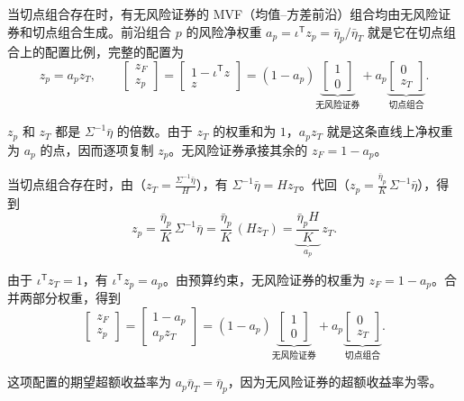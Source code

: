 \begin{tcolorbox}
 当切点组合存在时，有无风险证券的 MVF（均值--方差前沿）组合均由无风险证券和切点组合生成。前沿组合 $p$ 的风险净权重 $a_p=\iota^{\mathsf T}z_p=\bar\eta_p/\bar\eta_T$ 就是它在切点组合上的配置比例，完整的配置为
\begin{equation}
 z_p=a_pz_T,\qquad
 \begin{bmatrix}z_F\\z_p\end{bmatrix}
 =\begin{bmatrix}1-\iota^{\mathsf T}z\\z\end{bmatrix}=(1-a_p)\underbrace{\begin{bmatrix}1\\0\end{bmatrix}}_{\text{无风险证券}}
 +a_p\underbrace{\begin{bmatrix}0\\z_T\end{bmatrix}}_{\text{切点组合}}.
 \label{eq:wj-12-8}
\end{equation}
\end{tcolorbox}

$z_p$ 和 $z_T$ 都是 $\Sigma^{-1}\bar\eta$ 的倍数。由于 $z_T$ 的权重和为 $1$，$a_pz_T$ 就是这条直线上净权重为 $a_p$ 的点，因而逐项复制 $z_p$。无风险证券承接其余的 $z_F=1-a_p$。

\begin{solution}[label-content={证明},blank-type=none]
当切点组合存在时，由（$z_T=\frac{\Sigma^{-1}\bar\eta}{H}$），有 $\Sigma^{-1}\bar\eta=Hz_T$。代回（$z_p=\frac{\bar\eta_p}{K}\,\Sigma^{-1}\bar\eta$），得到
\[
 z_p=\frac{\bar\eta_p}{K}\,\Sigma^{-1}\bar\eta
    =\frac{\bar\eta_p}{K}\,(Hz_T)
    =\underbrace{\frac{\bar\eta_p H}{K}}_{a_p}\,z_T.
\]

由于 $\iota^{\mathsf T}z_T=1$，有 $\iota^{\mathsf T}z_p=a_p$。由预算约束，无风险证券的权重为 $z_F=1-a_p$。合并两部分权重，得到
\[
 \begin{bmatrix}z_F\\z_p\end{bmatrix}
 =\begin{bmatrix}1-a_p\\a_pz_T\end{bmatrix}
 =(1-a_p)\underbrace{\begin{bmatrix}1\\0\end{bmatrix}}_{\text{无风险证券}}
 +a_p\underbrace{\begin{bmatrix}0\\z_T\end{bmatrix}}_{\text{切点组合}}.
\]

这项配置的期望超额收益率为 $a_p\bar\eta_T=\bar\eta_p$，因为无风险证券的超额收益率为零。
\end{solution}

